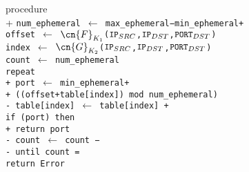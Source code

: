 
\begin{algorithm}{}{\thetcbcounter}
	\begin{pseudo}[indent-mark,kw,hl-warn=false]
		procedure  \\+
		\tt{num\_ephemeral} $\leftarrow$ \tt{max\_ephemeral}−\tt{min\_ephemeral}+ \\
    \tt{offset} $\leftarrow$ $\cn{F}_{K_1}$($\tt{IP}_{SRC}$,$\tt{IP}_{DST}$,$\tt{PORT}_{DST}$) \\
    \tt{index} $\leftarrow$ $\cn{G}_{K_2}$($\tt{IP}_{SRC}$,$\tt{IP}_{DST}$,$\tt{PORT}_{DST}$) \\
		\tt{count} $\leftarrow$ \tt{num\_ephemeral} \\
		repeat \\+
		\tt{port} $\leftarrow$ \tt{min\_ephemeral}+\\+
		((\tt{offset}+\tt{table[index]}) mod \tt{num\_ephemeral}) \\-
		\tt{table[index]} $\leftarrow$ \tt{table[index]} + \\
		if (\tt{port}) then \\+
		return \tt{port} \\-
		\tt{count} $\leftarrow$ \tt{count} −  \\-
		until \tt{count} =  \\
		return \tt{Error}\\
	\end{pseudo}
\end{algorithm}
